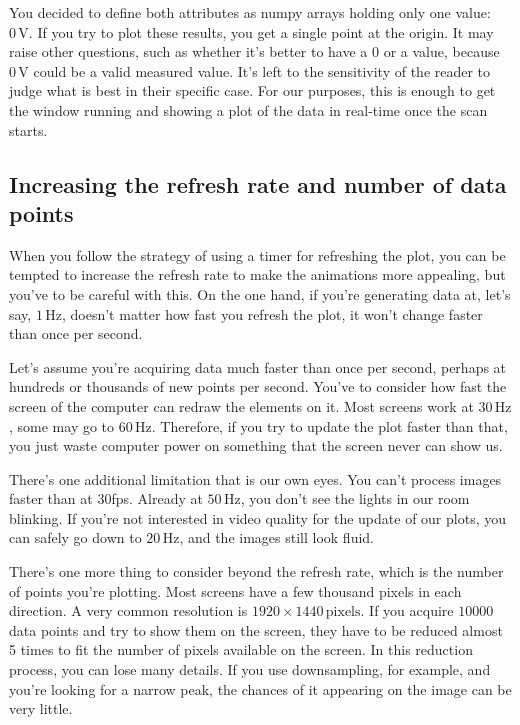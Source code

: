 You decided to define both attributes as numpy arrays holding only one value: $0\,\textrm{V}$. If you try to plot these results, you get a single point at the origin. It may raise other questions, such as whether it's better to have a $0$ or a  value, because $0\,\textrm{V}$ could be a valid measured value. It's left to the sensitivity of the reader to judge what is best in their specific case. For our purposes, this is enough to get the window running and showing a plot of the data in real-time once the scan starts.


\subsection{Increasing the refresh rate and number of data points}\label{subsec:refresh-rate-and-number-of-data-points}
When you follow the strategy of using a timer for refreshing the plot, you can be tempted to increase the refresh rate to make the animations more appealing, but you've to be careful with this. On the one hand, if you're generating data at, let's say, $1\,\textrm{Hz}$, doesn't matter how fast you refresh the plot, it won't change faster than once per second.

Let's assume you're acquiring data much faster than once per second, perhaps at hundreds or thousands of new points per second. You've to consider how fast the screen of the computer can redraw the elements on it. Most screens work at $30\,\textrm{Hz}$, some may go to $60\,\textrm{Hz}$. Therefore, if you try to update the plot faster than that, you just waste computer power on something that the screen never can show us.

There's one additional limitation that is our own eyes. You can't process images faster than at 30fps. Already at $50\,\textrm{Hz}$, you don't see the lights in our room blinking. If you're not interested in video quality for the update of our plots, you can safely go down to $20\,\textrm{Hz}$, and the images still look fluid.


There's one more thing to consider beyond the refresh rate, which is the number of points you're plotting. Most screens have a few thousand pixels in each direction. A very common resolution is $1920\times1440\,\textrm{pixels}$. If you acquire $10000$ data points and try to show them on the screen, they have to be reduced almost 5 times to fit the number of pixels available on the screen. In this reduction process, you can lose many details. If you use downsampling, for example, and you're looking for a narrow peak, the chances of it appearing on the image can be very little.

